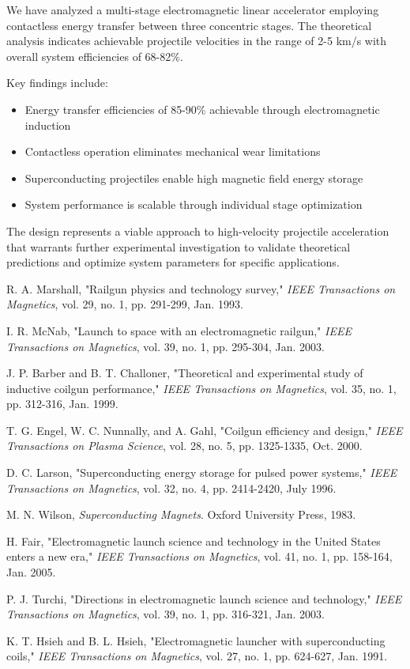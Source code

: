 \documentclass[12pt,a4paper]{article}
\begin{document}
We have analyzed a multi-stage electromagnetic linear accelerator employing contactless energy transfer between three concentric stages. The theoretical analysis indicates achievable projectile velocities in the range of 2-5 km/s with overall system efficiencies of 68-82\%.

Key findings include:
\begin{itemize}
\item Energy transfer efficiencies of 85-90\% achievable through electromagnetic induction
\item Contactless operation eliminates mechanical wear limitations
\item Superconducting projectiles enable high magnetic field energy storage
\item System performance is scalable through individual stage optimization
\end{itemize}

The design represents a viable approach to high-velocity projectile acceleration that warrants further experimental investigation to validate theoretical predictions and optimize system parameters for specific applications.

\begin{thebibliography}{9}

R. A. Marshall, "Railgun physics and technology survey," \textit{IEEE Transactions on Magnetics}, vol. 29, no. 1, pp. 291-299, Jan. 1993.

I. R. McNab, "Launch to space with an electromagnetic railgun," \textit{IEEE Transactions on Magnetics}, vol. 39, no. 1, pp. 295-304, Jan. 2003.

J. P. Barber and B. T. Challoner, "Theoretical and experimental study of inductive coilgun performance," \textit{IEEE Transactions on Magnetics}, vol. 35, no. 1, pp. 312-316, Jan. 1999.

T. G. Engel, W. C. Nunnally, and A. Gahl, "Coilgun efficiency and design," \textit{IEEE Transactions on Plasma Science}, vol. 28, no. 5, pp. 1325-1335, Oct. 2000.

D. C. Larson, "Superconducting energy storage for pulsed power systems," \textit{IEEE Transactions on Magnetics}, vol. 32, no. 4, pp. 2414-2420, July 1996.

M. N. Wilson, \textit{Superconducting Magnets}. Oxford University Press, 1983.

H. Fair, "Electromagnetic launch science and technology in the United States enters a new era," \textit{IEEE Transactions on Magnetics}, vol. 41, no. 1, pp. 158-164, Jan. 2005.

P. J. Turchi, "Directions in electromagnetic launch science and technology," \textit{IEEE Transactions on Magnetics}, vol. 39, no. 1, pp. 316-321, Jan. 2003.

K. T. Hsieh and B. L. Hsieh, "Electromagnetic launcher with superconducting coils," \textit{IEEE Transactions on Magnetics}, vol. 27, no. 1, pp. 624-627, Jan. 1991.

\end{thebibliography}
\end{document}
